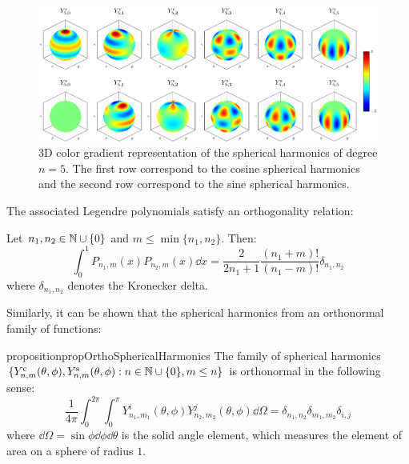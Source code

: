 \documentclass[../main.tex]{subfiles}
\begin{document}
\begin{figure}[ht]
  \centering
  \includegraphics[width=\textwidth]{Images/sphericalHarmonics.pdf}
  \caption{3D color gradient representation of the spherical harmonics of degree $n=5$. The first row correspond to the cosine spherical harmonics and the second row correspond to the sine spherical harmonics.}
\end{figure}
The associated Legendre polynomials satisfy an orthogonality relation:
\begin{lemma}\label{lem:ortho_asso_legendre}
  Let $n_1,n_2\in\mathbb{N}\cup\{0\}$ and $m\leq \min\{n_1,n_2\}$. Then:
  \begin{equation}
    \int_0^1 P_{n_1,m}(x) P_{n_2,m}(x) \dd{x}=\frac{2}{2n_1+1}\frac{(n_1+m)!}{(n_1-m)!} \delta_{n_1,n_2}
  \end{equation}
  where $\delta_{n_1,n_2}$ denotes the Kronecker delta.
\end{lemma}
Similarly, it can be shown that the spherical harmonics from an orthonormal family of functions:
\begin{restatable}{proposition}{propOrthoSphericalHarmonics}
  The family of spherical harmonics $\{Y_{n,m}^{\mathrm{c}}(\theta,\phi),Y_{n,m}^{\mathrm{s}}(\theta,\phi):n\in\mathbb{N}\cup\{0\},m\leq n\}$ is orthonormal in the following sense:
  \begin{equation}\label{eq:ortho_spherical_harmonics}
    \frac{1}{4\pi}\int_0^{2\pi}\int_0^\pi Y_{n_1,m_1}^i(\theta,\phi) Y_{n_2,m_2}^j(\theta,\phi)\dd\Omega=\delta_{n_1,n_2}\delta_{m_1,m_2}\delta_{i,j}
  \end{equation}
  where $\dd\Omega=\sin\phi\dd{\phi}\dd{\theta}$ is the solid angle element, which measures the element of area on a sphere of radius $1$.
\end{restatable}
\end{document}
